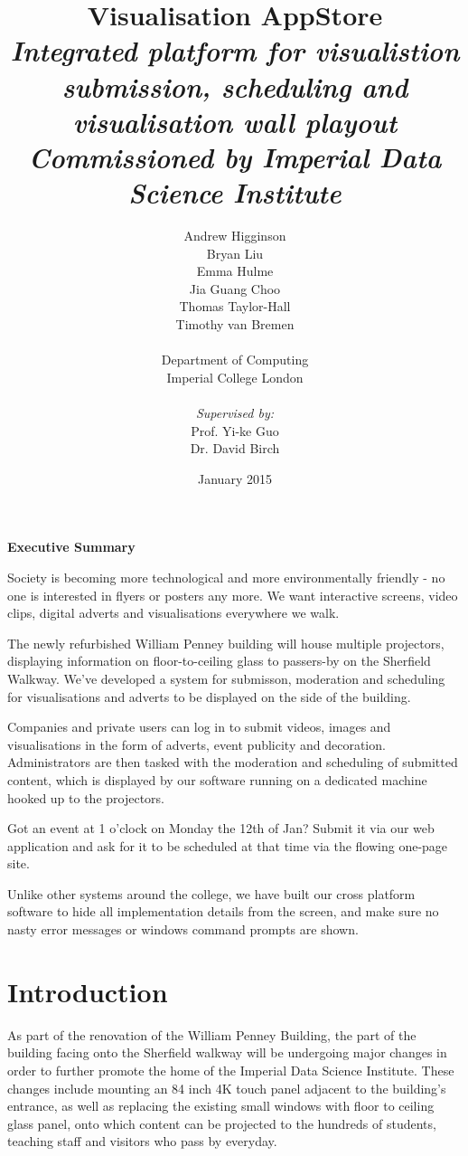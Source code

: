 \documentclass[a4paper, titlepage]{article}
\title{Visualisation AppStore \\ \vspace{10pt}
\textit{\large Integrated platform for visualistion submission, scheduling and visualisation wall playout} \\ \vspace*{-5pt}
\textit{\large Commissioned by Imperial Data Science Institute}}
\author{Andrew Higginson\\ Bryan Liu \\ Emma Hulme \\ Jia Guang Choo \\
        Thomas Taylor-Hall \\ Timothy van Bremen \\\\ 
        Department of Computing \\ Imperial College London \\\\ \textit{Supervised by:} \\
        Prof. Yi-ke Guo \\ Dr. David Birch}
\date{January 2015}
\begin{document}
\maketitle


\newpage
{}
\Large
\textbf{Executive Summary}

\normalsize

Society is becoming more technological and more environmentally friendly - no one is interested in 
flyers or posters any more. We want interactive screens, video clips, digital adverts and 
visualisations everywhere we walk.

The newly refurbished William Penney building will house multiple projectors, displaying information
on floor-to-ceiling glass to passers-by on the Sherfield Walkway. We've developed a system for 
submisson, moderation and scheduling for visualisations and adverts to be displayed on the side of 
the building. 

Companies and private users can log in to submit videos, images and visualisations in the form of 
adverts, event publicity and decoration. Administrators are then tasked with the moderation and 
scheduling of submitted content, which is displayed by our software running on a dedicated machine
hooked up to the projectors. 

Got an event at 1 o'clock on Monday the 12th of Jan? Submit it via our web application and ask for 
it to be scheduled at that time via the flowing one-page site. 

Unlike other systems around the college, we have built our cross platform software to hide all 
implementation details from the screen, and make sure no nasty error messages or windows command 
prompts are shown.





\newpage
\tableofcontents
\listoffigures
\listoftables


\newpage
{}
\section{Introduction}
As part of the renovation of the William Penney Building, the part of the building facing onto the Sherfield walkway will be undergoing major changes in order to further promote the home of the Imperial Data Science Institute. These changes include mounting an 84 inch 4K touch panel adjacent to the building's entrance, as well as replacing the existing small windows with floor to ceiling glass panel, onto which content can be projected to the hundreds of students, teaching staff and visitors who pass by everyday.
\end{document}
